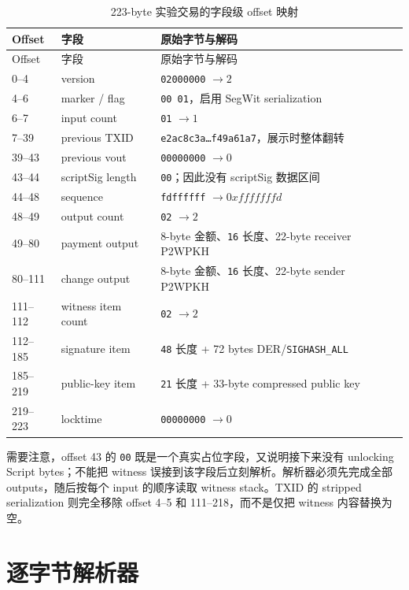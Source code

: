 \documentclass[11pt,a4paper,fontset=none]{ctexart}
\begin{document}
\begin{longtable}{p{}p{}p{}}
\caption{223-byte 实验交易的字段级 offset 映射}\label{tab:task1-byte-layout}\\
\toprule
Offset & 字段 & 原始字节与解码 \\
\midrule
\endfirsthead
\toprule
Offset & 字段 & 原始字节与解码 \\
\midrule
\endhead
0--4 & version & \texttt{02000000} $\rightarrow 2$ \\
4--6 & marker / flag & \texttt{00 01}，启用 SegWit serialization \\
6--7 & input count & \texttt{01} $\rightarrow 1$ \\
7--39 & previous TXID & \texttt{e2ac8c3a\ldots f49a61a7}，展示时整体翻转 \\
39--43 & previous vout & \texttt{00000000} $\rightarrow 0$ \\
43--44 & scriptSig length & \texttt{00}；因此没有 scriptSig 数据区间 \\
44--48 & sequence & \texttt{fdffffff} $\rightarrow 0xfffffffd$ \\
48--49 & output count & \texttt{02} $\rightarrow 2$ \\
49--80 & payment output & 8-byte 金额、\texttt{16} 长度、22-byte receiver P2WPKH \\
80--111 & change output & 8-byte 金额、\texttt{16} 长度、22-byte sender P2WPKH \\
111--112 & witness item count & \texttt{02} $\rightarrow 2$ \\
112--185 & signature item & \texttt{48} 长度 + 72 bytes DER/\texttt{SIGHASH\_ALL} \\
185--219 & public-key item & \texttt{21} 长度 + 33-byte compressed public key \\
219--223 & locktime & \texttt{00000000} $\rightarrow 0$ \\
\bottomrule
\end{longtable}

需要注意，offset 43 的 \texttt{00} 既是一个真实占位字段，又说明接下来没有 unlocking Script bytes；不能把 witness 误接到该字段后立刻解析。解析器必须先完成全部 outputs，随后按每个 input 的顺序读取 witness stack。TXID 的 stripped serialization 则完全移除 offset 4--5 和 111--218，而不是仅把 witness 内容替换为空。

\section{逐字节解析器}
\end{document}
